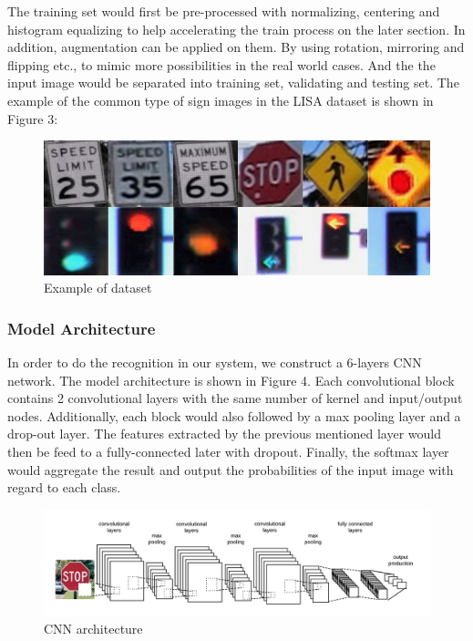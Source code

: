 \documentclass[conference]{IEEEtran}
\begin{document}
The training set would first be pre-processed with normalizing, centering and histogram equalizing to help accelerating the train process on the later section. In addition, augmentation can be applied on them. By using rotation, mirroring and flipping etc., to mimic more possibilities in the real world cases. And the the input image would be separated into training set, validating and testing set. The example of the common type of sign images in the LISA dataset is shown in Figure 3:

\begin{figure}[hb]
\centering
  \begin{minipage}{.4\textwidth}
    \centering
    \includegraphics[width=0.8\linewidth]{dataset3.jpg}
    \caption{Example of dataset}
    \label{fig:fig_1}
  \end{minipage}
\end{figure}

\subsubsection{Model Architecture}
In order to do the recognition in our system, we construct a 6-layers CNN network. The model architecture is shown in Figure 4. Each convolutional block contains 2 convolutional layers with the same number of kernel and input/output nodes. Additionally, each block would also followed by a max pooling layer and a drop-out layer. The features extracted by the previous mentioned layer would then be feed to a fully-connected later with dropout. Finally, the softmax layer would aggregate the result and output the probabilities of the input image with regard to each class.

\begin{figure}[H]
\centering
  \begin{minipage}{.5\textwidth}
    \centering
    \includegraphics[width=0.8\linewidth]{convolutional_layer.png}
    \caption{CNN architecture}
    \label{fig:fig_1}
  \end{minipage}
\end{figure}
\end{document}
